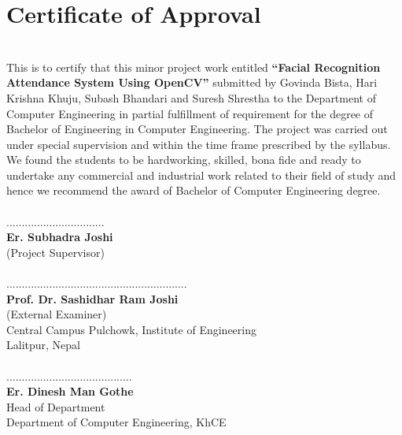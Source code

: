 
		\large
			\chapter*{Certificate of Approval}
		\normalsize
			\justify \\
This is to  certify that this minor project  work entitled \textbf{“Facial Recognition Attendance System Using OpenCV”} submitted by Govinda Bista, Hari Krishna Khuju,
Subash Bhandari and Suresh Shrestha to the Department of Computer Engineering in partial fulfillment of requirement for
the degree of Bachelor of Engineering in Computer Engineering. The project was
carried out under special supervision and within the time frame prescribed by the
syllabus.
\\
We found the students to be hardworking, skilled, bona fide and ready to undertake any
commercial and industrial work related to their field of study and hence we recommend
the award of Bachelor of Computer Engineering degree.\\
\vspace{1.5cm}
\\
................................\\
\textbf{Er. Subhadra Joshi}\\
(Project Supervisor)\\
\vspace{1.5cm}
\\
...........................................................\\
\textbf{Prof. Dr. Sashidhar Ram Joshi}\\
(External Examiner)\\
Central Campus Pulchowk, Institute of Engineering\\
Lalitpur, Nepal\\
\vspace{1.5cm}\\
.........................................\\
\textbf{Er. Dinesh Man Gothe}\\
Head of Department\\
Department of Computer Engineering, KhCE\\
        \break



		\large
